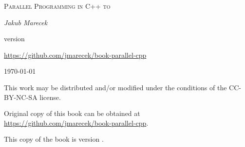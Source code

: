 \begin{titlepage}
	\centering
	\vspace{2cm}
	{\scshape\huge Parallel Programming in C++ to\par}
	\vspace{2cm}
	{\Large\itshape Jakub Marecek\par}
	\vfill
	version \version\par
	\href{https://github.com/jmarecek/book-parallel-cpp}{https://github.com/jmarecek/book-parallel-cpp}

	\vfill

	{\large \today\par}
\end{titlepage}

\pagestyle{empty}
\begingroup
\footnotesize
\parindent 0pt
\parskip \baselineskip
\vfill

This work may be distributed and/or modified under the conditions of the CC-BY-NC-SA license.

Original copy of this book can be obtained at \href{https://github.com/jmarecek/book-parallel-cpp}{https://github.com/jmarecek/book-parallel-cpp}.

This copy of the book is version \version.

\vfill

\vspace*{2\baselineskip}


\endgroup
\clearpage
\pagestyle{plain}